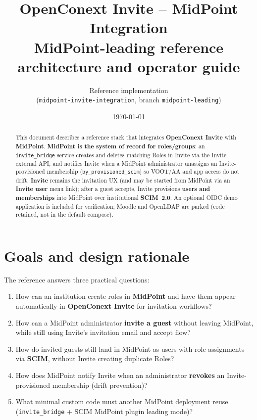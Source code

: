\documentclass[11pt,a4paper]{article}
\title{%
  OpenConext Invite -- MidPoint Integration\\
  \large MidPoint-leading reference architecture and operator guide
}
\author{Reference implementation\\(\texttt{midpoint-invite-integration}, branch \texttt{midpoint-leading})}
\date{\today}
\begin{document}
\maketitle

\begin{abstract}
This document describes a reference stack that integrates
\textbf{OpenConext Invite} with \textbf{MidPoint}.
\textbf{MidPoint is the system of record for roles/groups}: an
\texttt{invite\_bridge} service creates and deletes matching Roles in Invite
via the Invite external API, and notifies Invite when a MidPoint administrator
unassigns an Invite-provisioned membership (\texttt{by\_provisioned\_scim}) so
VOOT/AA and app access do not drift.
\textbf{Invite} remains the invitation UX (and may be started from MidPoint via
an \textbf{Invite user} menu link); after a guest accepts, Invite provisions
\textbf{users and memberships} into MidPoint over institutional
\textbf{SCIM~2.0}.
An optional OIDC demo application is included for verification; Moodle and
OpenLDAP are parked (code retained, not in the default compose).
\end{abstract}

\tableofcontents
\newpage

\section{Goals and design rationale}

The reference answers three practical questions:

\begin{enumerate}[leftmargin=*]
  \item How can an institution create roles in \textbf{MidPoint} and have them
        appear automatically in \textbf{OpenConext Invite} for invitation workflows?
  \item How can a MidPoint administrator \textbf{invite a guest} without leaving
        MidPoint, while still using Invite's invitation email and accept flow?
  \item How do invited guests still land in MidPoint as users with role
        assignments via \textbf{SCIM}, without Invite creating duplicate Roles?
  \item How does MidPoint notify Invite when an administrator \textbf{revokes}
        an Invite-provisioned membership (drift prevention)?
  \item What minimal custom code must another MidPoint deployment reuse
        (\texttt{invite\_bridge} + SCIM MidPoint plugin leading mode)?
\end{enumerate}
\end{document}
